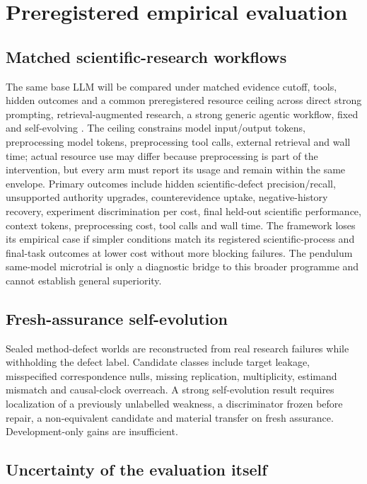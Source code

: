 \section{Preregistered empirical evaluation}
\subsection{Matched scientific-research workflows}
The same base LLM will be compared under matched evidence cutoff, tools, hidden outcomes and a common preregistered resource ceiling across direct strong prompting, retrieval-augmented research, a strong generic agentic workflow, fixed \RAKL{} and self-evolving \RAKL{}. The ceiling constrains model input/output tokens, preprocessing model tokens, preprocessing tool calls, external retrieval and wall time; actual resource use may differ because preprocessing is part of the intervention, but every arm must report its usage and remain within the same envelope. Primary outcomes include hidden scientific-defect precision/recall, unsupported authority upgrades, counterevidence uptake, negative-history recovery, experiment discrimination per cost, final held-out scientific performance, context tokens, preprocessing cost, tool calls and wall time. The framework loses its empirical case if simpler conditions match its registered scientific-process and final-task outcomes at lower cost without more blocking failures. The pendulum same-model microtrial is only a diagnostic bridge to this broader programme and cannot establish general superiority.

\subsection{Fresh-assurance self-evolution}
Sealed method-defect worlds are reconstructed from real research failures while withholding the defect label. Candidate classes include target leakage, misspecified correspondence nulls, missing replication, multiplicity, estimand mismatch and causal-clock overreach. A strong self-evolution result requires localization of a previously unlabelled weakness, a discriminator frozen before repair, a non-equivalent candidate and material transfer on fresh assurance. Development-only gains are insufficient.

\subsection{Uncertainty of the evaluation itself}


